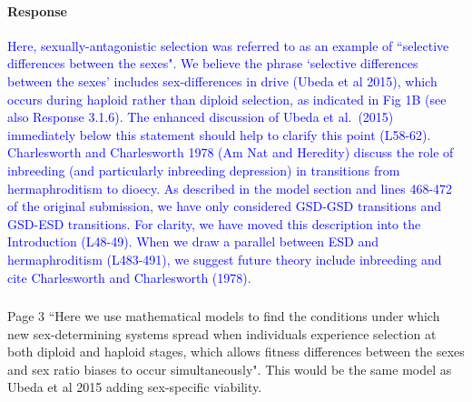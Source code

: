 \documentclass[10pt,letterpaper]{article}
\begin{document}
\noindent\paragraph{Response}
\textcolor{blue}{
Here, sexually-antagonistic selection was referred to as an example of ``selective differences between the sexes". 
We believe the phrase `selective differences between the sexes' includes sex-differences in drive (Ubeda et al 2015), which occurs during haploid rather than diploid selection, as indicated in Fig 1B (see also Response 3.1.6).
The enhanced discussion of Ubeda et al.\ (2015) immediately below this statement should help to clarify this point (L58-62).
\\ 
Charlesworth and Charlesworth 1978 (Am Nat and Heredity) discuss the role of inbreeding (and particularly inbreeding depression) in transitions from hermaphroditism to dioecy. 
As described in the model section and lines 468-472 of the original submission, we have only considered GSD-GSD transitions and GSD-ESD transitions.
For clarity, we have moved this description into the Introduction (L48-49). 
When we draw a parallel between ESD and hermaphroditism (L483-491), we suggest future theory include inbreeding and cite Charlesworth and Charlesworth (1978). 
}

\noindent\subsubsection{}
Page 3 ``Here we use mathematical models to find the conditions under which new sex-determining systems spread when individuals experience selection at both diploid and haploid stages, which allows fitness differences between the sexes and sex ratio biases to occur simultaneously".
This would be the same model as Ubeda et al 2015 adding sex-specific viability.
\end{document}
